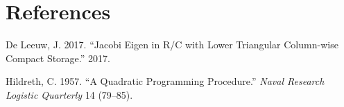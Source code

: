 \documentclass[
  12pt,
]{article}
\newlength{\cslhangindent}
\newenvironment{CSLReferences}[2] %
 {\begin{list}{}{%
  \setlength{\itemindent}{0pt}
  \setlength{\leftmargin}{0pt}
  \setlength{\parsep}{0pt}
  \ifodd #1
   \setlength{\leftmargin}{\cslhangindent}
   \setlength{\itemindent}{-1\cslhangindent}
  \fi
  \setlength{\itemsep}{#2\baselineskip}}}
 {\end{list}}
\begin{document}
\section*{References}\label{references}

\label{refs}
\begin{CSLReferences}{1}{0}
De Leeuw, J. 2017. {``{Jacobi Eigen in R/C with Lower Triangular Column-wise Compact Storage}.''} 2017.

Hildreth, C. 1957. {``{A Quadratic Programming Procedure}.''} \emph{Naval Research Logistic Quarterly} 14 (79--85).

\end{CSLReferences}
\end{document}
